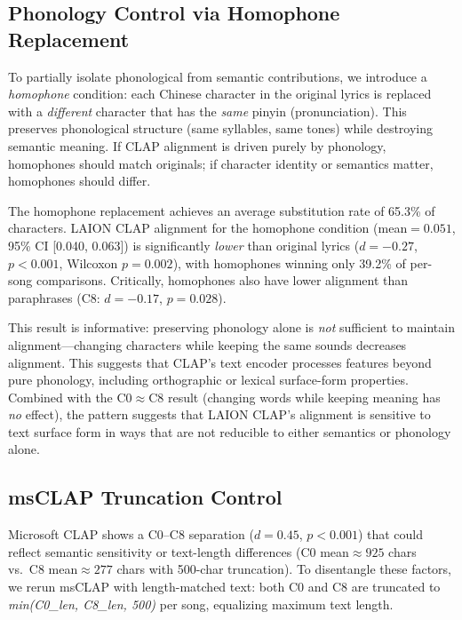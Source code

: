 \documentclass[11pt]{article}
\begin{document}
\subsection{Phonology Control via Homophone Replacement}\label{sec:homophone}

To partially isolate phonological from semantic contributions, we introduce a \emph{homophone} condition: each Chinese character in the original lyrics is replaced with a \emph{different} character that has the \emph{same} pinyin (pronunciation). This preserves phonological structure (same syllables, same tones) while destroying semantic meaning. If CLAP alignment is driven purely by phonology, homophones should match originals; if character identity or semantics matter, homophones should differ.

The homophone replacement achieves an average substitution rate of 65.3\% of characters. LAION CLAP alignment for the homophone condition (mean${=}0.051$, 95\% CI [0.040, 0.063]) is significantly \emph{lower} than original lyrics ($d{=}{-}0.27$, $p{<}0.001$, Wilcoxon $p{=}0.002$), with homophones winning only 39.2\% of per-song comparisons. Critically, homophones also have lower alignment than paraphrases (C8: $d{=}{-}0.17$, $p{=}0.028$).

This result is informative: preserving phonology alone is \emph{not} sufficient to maintain alignment—changing characters while keeping the same sounds decreases alignment. This suggests that CLAP's text encoder processes features beyond pure phonology, including orthographic or lexical surface-form properties. Combined with the C0$\approx$C8 result (changing words while keeping meaning has \emph{no} effect), the pattern suggests that LAION CLAP's alignment is sensitive to text surface form in ways that are not reducible to either semantics or phonology alone.

\subsection{msCLAP Truncation Control}\label{sec:truncation}

Microsoft CLAP shows a C0--C8 separation ($d{=}0.45$, $p{<}0.001$) that could reflect semantic sensitivity or text-length differences (C0 mean${\approx}925$ chars vs.\ C8 mean${\approx}277$ chars with 500-char truncation). To disentangle these factors, we rerun msCLAP with length-matched text: both C0 and C8 are truncated to \emph{min(C0\_len, C8\_len, 500)} per song, equalizing maximum text length.
\end{document}
